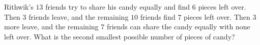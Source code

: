 Rithwik's $13$ friends try to share his candy equally and find $6$ pieces left over. Then $3$ friends leave, and the remaining $10$ friends find $7$ pieces left over. Then $3$ more leave, and the remaining $7$ friends can share the candy equally with none left over. What is the second smallest possible number of pieces of candy?
